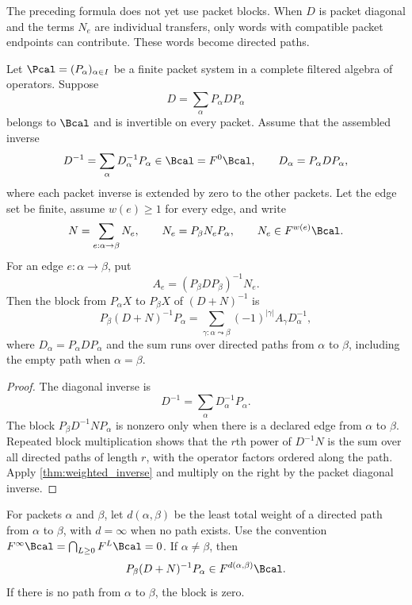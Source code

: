 The preceding formula does not yet use packet blocks. When $D$ is packet diagonal and the terms $N_e$ are individual transfers, only words with compatible packet endpoints can contribute. These words become directed paths.

\begin{theorem}\label{thm:block_path_formula}
Let $\Pcal=(P_\alpha)_{\alpha\in I}$ be a finite packet system in a complete filtered algebra of operators.  Suppose
\[
D=\sum_\alpha P_\alpha D P_\alpha
\]
belongs to $\Bcal$ and is invertible on every packet.  Assume that the assembled inverse
\[
D^{-1}=\sum_\alpha D_\alpha^{-1}P_\alpha\in\Bcal=F^0\Bcal,
\qquad D_\alpha=P_\alpha DP_\alpha,
\]
where each packet inverse is extended by zero to the other packets.  Let the edge set be finite, assume $w(e)\geq1$ for every edge, and write
\[
N=\sum_{e:\alpha\to\beta}N_e,
\qquad
N_e=P_\beta N_eP_\alpha,
\qquad
N_e\in F^{w(e)}\Bcal.
\]
For an edge $e:\alpha\to\beta$, put
\[
A_e=(P_\beta DP_\beta)^{-1}N_e.
\]
Then the block from $P_\alpha X$ to $P_\beta X$ of $(D+N)^{-1}$ is
\[
P_\beta(D+N)^{-1}P_\alpha
=
\sum_{\gamma:\alpha\leadsto\beta}
(-1)^{|\gamma|}A_\gamma D_\alpha^{-1},
\]
where $D_\alpha=P_\alpha DP_\alpha$ and the sum runs over directed paths from $\alpha$ to $\beta$, including the empty path when $\alpha=\beta$.
\end{theorem}

\begin{proof}
The diagonal inverse is
\[
D^{-1}=\sum_\alpha D_\alpha^{-1}P_\alpha.
\]
The block $P_\beta D^{-1}NP_\alpha$ is nonzero only when there is a declared edge from $\alpha$ to $\beta$.  Repeated block multiplication shows that the $r$th power of $D^{-1}N$ is the sum over all directed paths of length $r$, with the operator factors ordered along the path.  Apply \cref{thm:weighted_inverse} and multiply on the right by the packet diagonal inverse.
\end{proof}

\begin{corollary}\label{cor:minimum_path_weight}
For packets $\alpha$ and $\beta$, let $d(\alpha,\beta)$ be the least total weight of a directed path from $\alpha$ to $\beta$, with $d=\infty$ when no path exists.  Use the convention $F^\infty\Bcal=\bigcap_{L\geq0}F^L\Bcal=0$.  If $\alpha\ne\beta$, then
\[
P_\beta(D+N)^{-1}P_\alpha
\in
F^{d(\alpha,\beta)}\Bcal.
\]
If there is no path from $\alpha$ to $\beta$, the block is zero.
\end{corollary}

